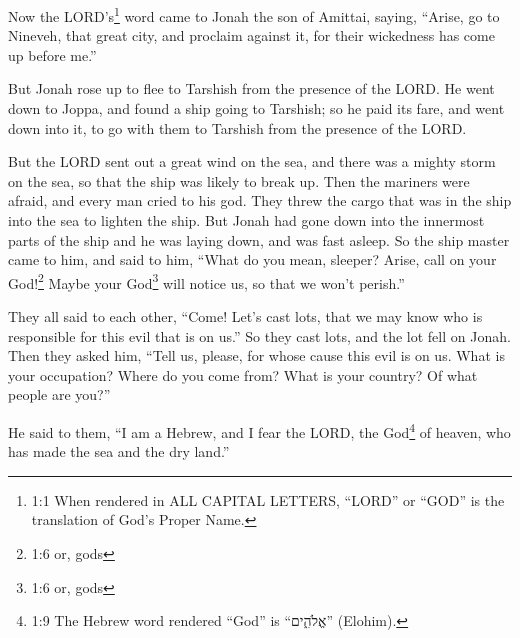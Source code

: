 \newpage
\null
\thispagestyle{empty}
\newpage
{}






\vspace{-1.36in}

\mychapter{} \myverse*{}Now the LORD’s\footnote{1:1 When rendered in ALL CAPITAL LETTERS, “LORD” or “GOD” is the translation of God’s Proper Name.}
word came to Jonah the son of Amittai, saying,
\myverse{}“Arise, go to Nineveh, that great city, and proclaim against it, for their wickedness
has come up before me.”

\myverse{}But Jonah rose up to flee to Tarshish from the presence of the
LORD. He went down to Joppa, and found a ship going to Tarshish; so he paid its fare, and went down into
it, to go with them to Tarshish from the presence of the LORD.

\myverse{}But the LORD sent out a great wind on the sea, and there was a
mighty storm on the sea, so that the ship was likely to break up.
\myverse{}Then the mariners were afraid, and every man cried to his god. They threw the
cargo that was in the ship into the sea to lighten the ship. But Jonah had gone down into the innermost
parts of the ship and he was laying down, and was fast asleep.
\myverse{}So the ship master came to him, and said to him, “What do you mean, sleeper?
Arise, call on your God!\footnote{1:6 or, gods} Maybe your God\footnote{1:6 or, gods
} will notice us, so that we won’t perish.”

\myverse{}They all said to each other, “Come! Let’s cast lots, that we may
know who is responsible for this evil that is on us.” So they cast lots, and the lot fell on Jonah.
\myverse{}Then they asked him, “Tell us, please, for whose cause this evil is on us. What
is your occupation? Where do you come from? What is your country? Of what people are you?”

\myverse{}He said to them, “I am a Hebrew, and I fear the LORD, the God\footnote{1:9 The Hebrew word rendered “God” is “אֱלֹהִ֑ים” (Elohim).} of heaven, who has
made the sea and the dry land.”

